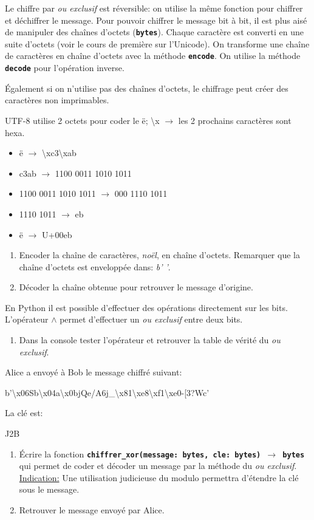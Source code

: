 \documentclass[a4paper,11pt]{article}
\begin{document}
\begin{exo}
Le chiffre par \emph{ou exclusif} est réversible: on utilise la même fonction pour chiffrer et déchiffrer le message. Pour pouvoir chiffrer le message bit à bit, il est plus aisé de manipuler des chaînes d'octets (\textbf{\texttt{bytes}}). Chaque caractère est converti en une suite d'octets (voir le cours de première sur l'Unicode). On transforme une chaîne de caractères en chaîne d'octets avec la méthode \textbf{\texttt{encode}}. On utilise la méthode \textbf{\texttt{decode}} pour l'opération inverse.
\begin{commentprof}
Également si on n'utilise pas des chaînes d'octets, le chiffrage peut créer des caractères non imprimables.

UTF-8 utilise 2 octets pour coder le ë; \textbackslash x $\rightarrow$ les 2 prochains caractères sont hexa.
\begin{itemize}
    \item ë $\rightarrow$ \textbackslash xc3\textbackslash xab
    \item c3ab $\rightarrow$ 1100 0011 1010 1011
    \item 1100 0011 1010 1011 $\rightarrow$ 000 1110 1011
    \item 1110 1011 $\rightarrow$ eb
    \item ë $\rightarrow$ U+00eb
\end{itemize}
\end{commentprof}
\begin{enumerate}
    \item Encoder la chaîne de caractères, \emph{noël}, en chaîne d'octets. Remarquer que la chaîne d'octets est enveloppée dans: \emph{b' '}.
    \item Décoder la chaîne obtenue pour retrouver le message d'origine.
\end{enumerate}
En Python il est possible d'effectuer des opérations directement sur les bits. L'opérateur $\wedge$ permet d'effectuer un \emph{ou exclusif} entre deux bits.
\begin{enumerate}[resume]
    \item Dans la console tester l'opérateur et retrouver la table de vérité du \emph{ou exclusif}.
\end{enumerate}
Alice a envoyé à Bob le message chiffré suivant:
\begin{center}
    b'\textbackslash x06Sb\textbackslash x04a\textbackslash x0bjQe/A6j\_\textbackslash x81\textbackslash xe8\textbackslash xf1\textbackslash xe0-[3?Wc'
\end{center}
La clé est:
\begin{center}
    J2B
\end{center}
\begin{enumerate}[resume]
    \item Écrire la fonction \textbf{\texttt{chiffrer\_xor(message: bytes, cle: bytes) $\rightarrow$ bytes}} qui permet de coder et décoder un message par la méthode du \emph{ou exclusif}. \underline{Indication:} Une utilisation judicieuse du modulo permettra d'étendre la clé sous le message.
    \item Retrouver le message envoyé par Alice.
\end{enumerate} 
\end{exo}
\end{document}
